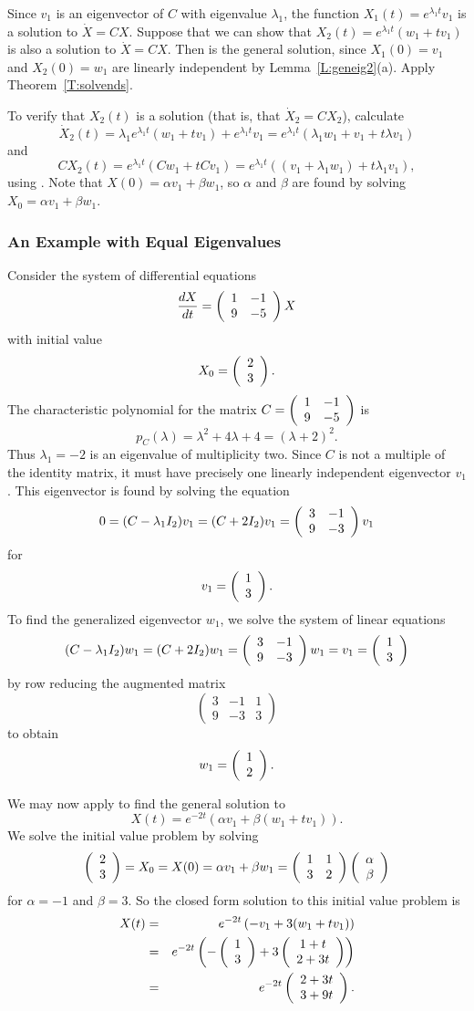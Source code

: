 Since $v_1$ is an eigenvector of $C$ with eigenvalue $\lambda_1$, the
function $X_1(t)=e^{\lambda_1 t}v_1$ is a solution to $\dot{X}=CX$.  Suppose
that we can show that $X_2(t)=e^{\lambda_1 t}(w_1+tv_1)$ is also a solution
to $\dot{X}=CX$.  Then  is the general solution, since
$X_1(0)=v_1$ and $X_2(0)=w_1$ are linearly independent by 
Lemma~\ref{L:geneig2}(a).  Apply Theorem~\ref{T:solvends}.

To verify that $X_2(t)$ is a solution (that is, that $\dot{X}_2=CX_2$),
calculate
\[
\dot{X}_2(t) = \lambda_1 e^{\lambda_1 t}(w_1+tv_1) + e^{\lambda_1 t}v_1=
e^{\lambda_1 t}(\lambda_1 w_1 + v_1 +t\lambda v_1)
\]
and
\[
CX_2(t) = e^{\lambda_1 t}(Cw_1+tCv_1) = e^{\lambda_1 t}
((v_1+\lambda_1 w_1)+t\lambda_1 v_1),
\]
using .  Note that $X(0)=\alpha v_1 + \beta w_1$, so $\alpha$
and $\beta$ are found by solving $X_0= \alpha v_1 + \beta w_1$.

\subsubsection*{An Example with Equal Eigenvalues}

Consider the system of differential equations
\begin{equation}  \label{e:shearexample}
\frac{dX}{dt} = \left(\begin{array}{rr} 1 & -1\\ 9 &-5\end{array}\right) X
\end{equation}
with initial value
\[
X_0 = \left(\begin{array}{r} 2 \\ 3\end{array}\right).
\]
The characteristic polynomial for the matrix $C=\left(\begin{array}{rr} 1 & -1\\ 9 &-5\end{array}\right)$ is
\[
p_C(\lambda) = \lambda^2 + 4\lambda +4 = (\lambda + 2)^2.
\]
Thus $\lambda_1=-2$ is an eigenvalue of multiplicity two.  Since
$C$ is not a multiple of the identity matrix, it must have
precisely one linearly independent eigenvector $v_1$.  This eigenvector is
found by solving the equation
\[
0 = (C-\lambda_1I_2)v_1 = (C+2I_2)v_1 = \left(\begin{array}{rr} 3 & -1\\ 9 &-3\end{array}\right)v_1
\]
for
\[
v_1=\left(\begin{array}{r} 1 \\ 3\end{array}\right).
\]
To find the generalized eigenvector $w_1$, we solve the system of linear
equations
\[
(C-\lambda_1I_2)w_1=(C+2I_2)w_1=\left(\begin{array}{rr} 3 & -1\\ 9 &-3\end{array}\right)w_1= v_1=\left(\begin{array}{r} 1 \\ 3\end{array}\right)
\]
by row reducing the augmented matrix
\[
\left(\begin{array}{rr|r} 3 & -1 & 1\\ 9 & -3 & 3 \end{array}\right)
\]
to obtain
\[
w_1 = \left(\begin{array}{r} 1 \\ 2\end{array}\right).
\]

We may now apply  to find the general solution to
\[
X(t) = e^{-2t}\left(\alpha v_1 +\beta (w_1+tv_1)\right).
\]
We solve the initial value problem by solving
\[
\left(\begin{array}{r} 2 \\ 3\end{array}\right) = X_0 = X(0) = \alpha v_1 +\beta w_1 =
\left(\begin{array}{rr} 1 & 1\\ 3 &2\end{array}\right)\left(\begin{array}{r} \alpha \\ \beta\end{array}\right)
\]
for $\alpha=-1$ and $\beta=3$.   So the closed form solution to this initial
value problem is
\begin{eqnarray*}
X(t) & = & e^{-2t}\left(-v_1 + 3(w_1+tv_1)\right)\\
& = & e^{-2t}\left(-\left(\begin{array}{r} 1 \\ 3\end{array}\right)+3\left(\begin{array}{c} 1+t \\ 2+3t\end{array}\right)\right)\\
& = & e^{-2t}\left(\begin{array}{r} 2+3t \\ 3+9t\end{array}\right).
\end{eqnarray*}

